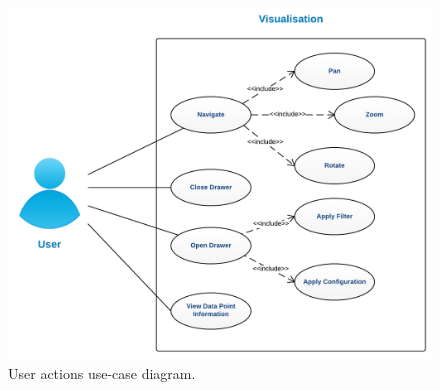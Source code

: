 \begin{figure}[H]
	\centering
    \includegraphics[width=\textwidth]{images/design/user_actions}
    \caption[User actions]{User actions use-case diagram.}
    \label{fig:user_actions}
\end{figure}
